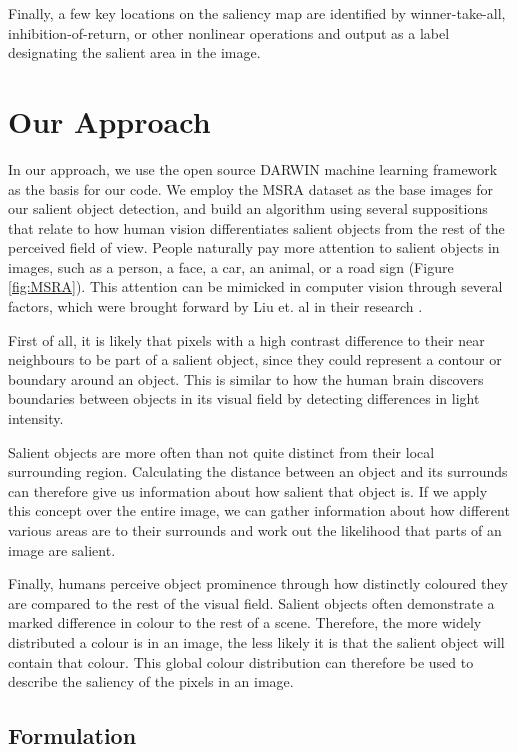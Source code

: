 \documentclass[10pt,twocolumn,letterpaper]{article}
\begin{document}
Finally, a few key locations on the saliency map are identified by winner-take-all, inhibition-of-return, or other nonlinear operations and output as a label designating the salient area in the image.

\section{Our Approach}
In our approach, we use the open source DARWIN machine learning framework \cite{drwn} as the basis for our code. We employ the MSRA dataset as the base images for our salient object detection, and build an algorithm using several suppositions that relate to how human vision differentiates salient objects from the rest of the perceived field of view.  People naturally pay more attention to salient objects in images, such as a person, a face, a car, an animal, or a road sign (Figure \ref{fig:MSRA}). This attention can be mimicked in computer vision through several factors, which were brought forward by Liu et. al in their research \cite{sal2007}\cite{sal2011}.

First of all, it is likely that pixels with a high contrast difference to their near neighbours to be part of a salient object, since they could represent a contour or boundary around an object.  This is similar to how the human brain discovers boundaries between objects in its visual field by detecting differences in light intensity.

Salient objects are more often than not quite distinct from their local surrounding region.  Calculating the distance between an object and its surrounds can therefore give us information about how salient that object is.  If we apply this concept over the entire image, we can gather information about how different various areas are to their surrounds and work out the likelihood that parts of an image are salient.

Finally, humans perceive object prominence through how distinctly coloured they are compared to the rest of the visual field.  Salient objects often demonstrate a marked difference in colour to the rest of a scene.  Therefore, the more widely distributed a colour is in an image, the less likely it is that the salient object will contain that colour.  This global colour distribution can therefore be used to describe the saliency of the pixels in an image.

\subsection{Formulation}
\end{document}
